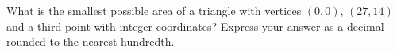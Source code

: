 What is the smallest possible area of a triangle with vertices $(0,0)$, $(27,14)$ and a third point with integer coordinates? Express your answer as a decimal rounded to the nearest hundredth.
